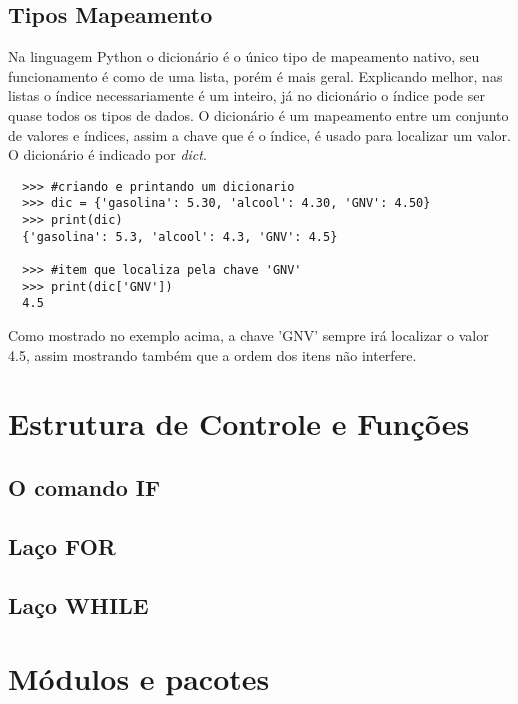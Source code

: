             \subsection{Tipos Mapeamento}
	Na linguagem Python o dicionário é o único tipo de mapeamento nativo, seu funcionamento é como de uma lista, porém é mais geral. Explicando melhor, nas listas o índice necessariamente é um inteiro, já no dicionário o índice pode ser quase todos os tipos de dados. O dicionário é um mapeamento entre um conjunto de valores e índices, assim a chave que é o índice, é usado para localizar um valor. O dicionário é indicado por \textit{dict}.
		\begin{lstlisting}
  >>> #criando e printando um dicionario
  >>> dic = {'gasolina': 5.30, 'alcool': 4.30, 'GNV': 4.50}
  >>> print(dic)
  {'gasolina': 5.3, 'alcool': 4.3, 'GNV': 4.5}
  
  >>> #item que localiza pela chave 'GNV'
  >>> print(dic['GNV'])
  4.5
	\end{lstlisting}
	Como mostrado no exemplo acima, a chave 'GNV' sempre irá localizar o valor 4.5, assim mostrando também que a ordem dos itens não interfere.

    \section{Estrutura de Controle e Funções}

            \subsection{O comando IF}


            \subsection{Laço FOR}

            \subsection{Laço WHILE}


    \section{Módulos e pacotes}




